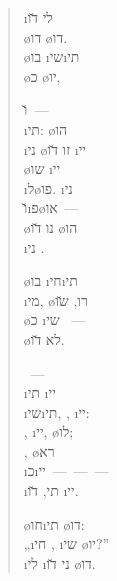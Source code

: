 
\begin{verse}
	 \i{לי} \u{דו}\\
	\o{דו} \o{דו}.\\
	\o{בו} \i{שי}\i{תי}\\
	\o{כ} \o{יו},

	\u{ו}~—\\
	\i{תי}: \o{הו}\\
	\i{ני} \o{זו} \u{דו} \i{יי}\\
	\o{שו}\gnuva {}  \i{יי}\\
	\i{ל}\o{פו}. \i{ני} \\
	\u{ו}\i{פ}\o{או}~—\\
	\o{נו} \u{דו}  \o{הו}\\
	\i{ני} .

	\o{בו} \i{חי}\i{תי} \s{ו}\\
	\i{מי}, \o{רו}, \u{שו}\\
	 \o{כ} \i{שי}\gnuva {} ~—\\
	\o{לא}  \u{דו}.

	~—\\
	\i{תי} \i{יי}\\
	\i{שי}\i{תי}, , \i{יי}:\\
	, \i{יי}, \o{לו};\\
	,  \o{רא}\\
	\i{כ}\i{יי}~—~—~—\\
	\i{תי},  \u{דו} \i{יי}.

	 \o{חו}\i{תי} \o{דו}:\\
	„\i{חי} ,  \i{שי} \o{יו}?”\\
	 \i{לי} \i{ני} \u{דו} \o{דו}.
\end{verse}
